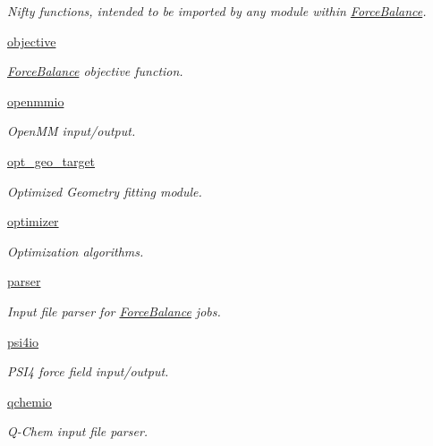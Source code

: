 \begin{DoxyCompactItemize}
\begin{DoxyCompactList}\small\item\em Nifty functions, intended to be imported by any module within \hyperlink{namespaceForceBalance}{Force\+Balance}. \end{DoxyCompactList}\item 
 \hyperlink{namespaceforcebalance_1_1objective}{objective}
\begin{DoxyCompactList}\small\item\em \hyperlink{namespaceForceBalance}{Force\+Balance} objective function. \end{DoxyCompactList}\item 
 \hyperlink{namespaceforcebalance_1_1openmmio}{openmmio}
\begin{DoxyCompactList}\small\item\em Open\+MM input/output. \end{DoxyCompactList}\item 
 \hyperlink{namespaceforcebalance_1_1opt__geo__target}{opt\+\_\+geo\+\_\+target}
\begin{DoxyCompactList}\small\item\em Optimized Geometry fitting module. \end{DoxyCompactList}\item 
 \hyperlink{namespaceforcebalance_1_1optimizer}{optimizer}
\begin{DoxyCompactList}\small\item\em Optimization algorithms. \end{DoxyCompactList}\item 
 \hyperlink{namespaceforcebalance_1_1parser}{parser}
\begin{DoxyCompactList}\small\item\em Input file parser for \hyperlink{namespaceForceBalance}{Force\+Balance} jobs. \end{DoxyCompactList}\item 
 \hyperlink{namespaceforcebalance_1_1psi4io}{psi4io}
\begin{DoxyCompactList}\small\item\em P\+S\+I4 force field input/output. \end{DoxyCompactList}\item 
 \hyperlink{namespaceforcebalance_1_1qchemio}{qchemio}
\begin{DoxyCompactList}\small\item\em Q-\/\+Chem input file parser. \end{DoxyCompactList}\item 

\end{DoxyCompactItemize}
